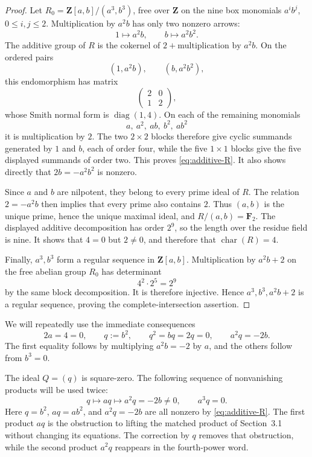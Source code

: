 \documentclass[11pt]{amsart}
\theoremstyle{remark}
\newcommand{\Z}{\mathbf Z}
\newcommand{\F}{\mathbf F}
\begin{document}
\begin{proof}
Let \(R_0=\Z[a,b]/(a^3,b^3)\), free over \(\Z\) on the nine box
monomials \(a^ib^j\), \(0\le i,j\le2\).  Multiplication by \(a^2b\)
has only two nonzero arrows:
\[
 1\longmapsto a^2b,\qquad b\longmapsto a^2b^2.
\]
The additive group of \(R\) is the cokernel of
\(2+\text{multiplication by }a^2b\).  On the ordered pairs
\[
 (1,a^2b),\qquad (b,a^2b^2),
\]
this endomorphism has matrix
\[
 \begin{pmatrix}2&0\\1&2\end{pmatrix},
\]
whose Smith normal form is \(\operatorname{diag}(1,4)\).  On each of
the remaining monomials
\[
 a,\ a^2,\ ab,\ b^2,\ ab^2
\]
it is multiplication by \(2\).  The two \(2\times2\) blocks therefore
give cyclic summands generated by \(1\) and \(b\), each of order four,
while the five \(1\times1\) blocks give the five displayed summands of
order two.  This proves \eqref{eq:additive-R}.  It also shows directly
that \(2b=-a^2b^2\) is nonzero.

Since \(a\) and \(b\) are nilpotent, they belong to every prime ideal
of \(R\).  The relation \(2=-a^2b\) then implies that every prime also
contains \(2\).  Thus \((a,b)\) is the unique prime, hence the unique
maximal ideal, and \(R/(a,b)=\F_2\).  The displayed additive
decomposition has order \(2^9\), so the length over the residue field
is nine.  It shows that \(4=0\) but \(2\ne0\), and therefore that
\(\operatorname{char}(R)=4\).

Finally, \(a^3,b^3\) form a regular sequence in \(\Z[a,b]\).
Multiplication by \(a^2b+2\) on the free abelian group \(R_0\) has
determinant
\[
 4^2\cdot2^5=2^9
\]
by the same block decomposition.  It is therefore injective.  Hence
\(a^3,b^3,a^2b+2\) is a regular sequence, proving the
complete-intersection assertion.
\end{proof}

We will repeatedly use the immediate consequences
\begin{equation}\label{eq:base-identities}
 2a=4=0,\qquad
 q:=b^2,\qquad
 q^2=bq=2q=0,\qquad
 a^2q=-2b.
\end{equation}
The first equality follows by multiplying \(a^2b=-2\) by \(a\), and the
others follow from \(b^3=0\).

The ideal \(Q=(q)\) is square-zero.  The following sequence of
nonvanishing products will be used twice:
\begin{equation}\label{eq:coefficient-chain}
 q\longmapsto aq\longmapsto a^2q=-2b\ne0,
 \qquad a^3q=0.
\end{equation}
Here \(q=b^2\), \(aq=ab^2\), and \(a^2q=-2b\) are all nonzero by
\eqref{eq:additive-R}.
The first product \(aq\) is the obstruction to lifting the matched
product of Section~3.1 without changing its equations.  The correction
by \(q\) removes that obstruction, while the second product \(a^2q\)
reappears in the fourth-power word.
\end{document}
